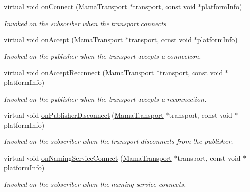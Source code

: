 \begin{DoxyCompactItemize}
virtual void \hyperlink{classWombat_1_1MamaTransportCallback_ae771d6e73c50bc7db49f1f449f23b3db}{onConnect} (\hyperlink{classWombat_1_1MamaTransport}{MamaTransport} $\ast$transport, const void $\ast$platformInfo)
\begin{DoxyCompactList}\small\item\em Invoked on the subscriber when the transport connects. \item\end{DoxyCompactList}\item 
virtual void \hyperlink{classWombat_1_1MamaTransportCallback_a849ef4f0e6f2c9c829a83fff1be2ad22}{onAccept} (\hyperlink{classWombat_1_1MamaTransport}{MamaTransport} $\ast$transport, const void $\ast$platformInfo)
\begin{DoxyCompactList}\small\item\em Invoked on the publisher when the transport accepts a connection. \item\end{DoxyCompactList}\item 
virtual void \hyperlink{classWombat_1_1MamaTransportCallback_ac159ce9502ac78e5eb5e85d911c5ee08}{onAcceptReconnect} (\hyperlink{classWombat_1_1MamaTransport}{MamaTransport} $\ast$transport, const void $\ast$platformInfo)
\begin{DoxyCompactList}\small\item\em Invoked on the publisher when the transport accepts a reconnection. \item\end{DoxyCompactList}\item 
virtual void \hyperlink{classWombat_1_1MamaTransportCallback_aae668afa6fad15114385473ac1ecfaaf}{onPublisherDisconnect} (\hyperlink{classWombat_1_1MamaTransport}{MamaTransport} $\ast$transport, const void $\ast$platformInfo)
\begin{DoxyCompactList}\small\item\em Invoked on the subscriber when the transport disconnects from the publisher. \item\end{DoxyCompactList}\item 
virtual void \hyperlink{classWombat_1_1MamaTransportCallback_a3ad4489dd4e812423d6e2447cae75da9}{onNamingServiceConnect} (\hyperlink{classWombat_1_1MamaTransport}{MamaTransport} $\ast$transport, const void $\ast$platformInfo)
\begin{DoxyCompactList}\small\item\em Invoked on the subscriber when the naming service connects. \item\end{DoxyCompactList}\item 

\end{DoxyCompactItemize}
